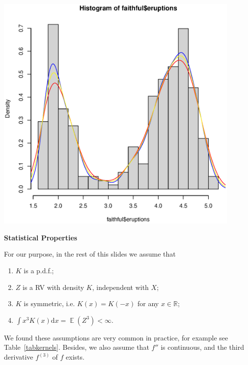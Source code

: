 \documentclass[19pt,landscape]{article}
\newtheorem{rem}[thm]{Remark}
\DeclareMathOperator{\E}{\mathbb{E}}
\newcommand{\R}{\mathbb{R}}
\begin{document}
\begin{center}
    \includegraphics[width=0.9\textwidth,height=0.5\textwidth]{erpt-kernel.eps}
\end{center}
\newpage
{\LARGE\centerline{\textbf{Statistical Properties}}}
\vskip15pt
    \large \noindent
    For our purpose, in the rest of this slides we assume that 
    \begin{enumerate}
        \item $K$ is a p.d.f.;
        \item $Z$ is a RV with density $K$, independent with $X$; 
        \item $K$ is symmetric, i.e. $K(x)=K(-x)$ for any $x\in\R$;\label{con-symm}
        \item $\int x^3 K(x)\mathrm{d}x=\E(Z^3)<\infty$.
    \end{enumerate}
    We found these assumptions are very common in practice, for example see Table~\ref{tabkernels}. 
    Besides, we also assume that $f''$ is continuous, and the third derivative $f^{(3)}$ of $f$ exists.
\end{document}
